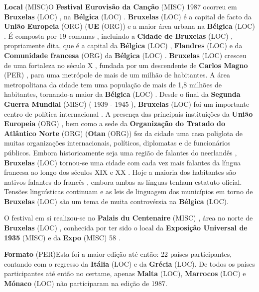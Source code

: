 \documentclass[12pt,a4paper]{article}
\begin{document}
\textbf{Local} (MISC)O \textbf{Festival Eurovisão da Canção} (MISC) 1987 ocorreu em \textbf{Bruxelas} (LOC) , na \textbf{Bélgica} (LOC) . \textbf{Bruxelas} (LOC) é a capital de facto da \textbf{União Europeia} (ORG) (\textbf{UE} (ORG)) e a maior área urbana na \textbf{Bélgica} (LOC) . É composta por 19 comunas , incluindo a \textbf{Cidade de Bruxelas} (LOC) , propriamente dita, que é a capital da \textbf{Bélgica} (LOC) , \textbf{Flandres} (LOC) e da \textbf{Comunidade francesa} (ORG) da \textbf{Bélgica} (LOC) . \textbf{Bruxelas} (LOC) cresceu de uma fortaleza no século X , fundada por um descendente de \textbf{Carlos Magno} (PER) , para uma metrópole de mais de um milhão de habitantes. A área metropolitana da cidade tem uma população de mais de 1,8 milhões de habitantes, tornando-a maior da \textbf{Bélgica} (LOC) . Desde o final da \textbf{Segunda Guerra Mundial} (MISC) ( 1939 - 1945 ), \textbf{Bruxelas} (LOC) foi um importante centro de política internacional . A presença das principais instituições da \textbf{União Europeia} (ORG) , bem como a sede da \textbf{Organização do Tratado do Atlântico Norte} (ORG) (\textbf{Otan} (ORG)) fez da cidade uma casa poliglota de muitas organizações internacionais, políticos, diplomatas e de funcionários públicos. Embora historicamente seja uma região de falantes do neerlandês , \textbf{Bruxelas} (LOC) tornou-se uma cidade com cada vez mais falantes da língua francesa ao longo dos séculos XIX e XX . Hoje a maioria dos habitantes são nativos falantes do francês , embora ambas as línguas tenham estatuto oficial. Tensões linguísticas continuam e as leis de linguagem dos municípios em torno de \textbf{Bruxelas} (LOC) são um tema de muita controvérsia na \textbf{Bélgica} (LOC).

O festival em si realizou-se no \textbf{Palais du Centenaire} (MISC) , área no norte de \textbf{Bruxelas} (LOC) , conhecida por ter sido o local da \textbf{Exposição Universal de 1935} (MISC) e da \textbf{Expo} (MISC) 58 .



\textbf{Formato} (PER)Esta foi a maior edição até então: 22 países participantes, contando com o regresso da \textbf{Itália} (LOC) e da \textbf{Grécia} (LOC). De todos os países participantes até então no certame, apenas \textbf{Malta} (LOC), \textbf{Marrocos} (LOC) e \textbf{Mónaco} (LOC) não participaram na edição de 1987.
\end{document}
